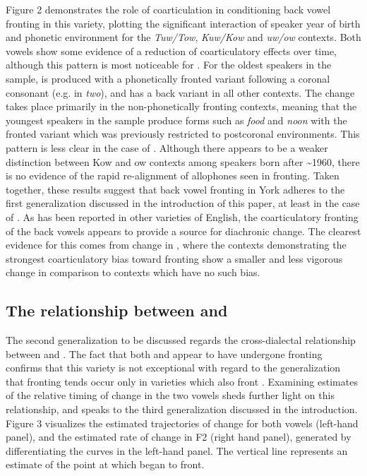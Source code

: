\documentclass[12pt]{article}
\begin{document}
Figure 2 demonstrates the role of coarticulation in conditioning back vowel fronting in this variety, plotting the significant interaction of speaker year of birth and phonetic environment for the \textit{Tuw/Tow}, \textit{Kuw/Kow} and \textit{uw/ow} contexts. Both vowels show some evidence of a reduction of coarticulatory effects over time, although this pattern is most noticeable for . For the oldest speakers in the sample,  is produced with a phonetically fronted variant following a coronal consonant (e.g. in \textit{two}), and has a back variant in all other contexts. The change takes place primarily in the non-phonetically fronting contexts, meaning that the youngest speakers in the sample produce forms such as \textit{food} and \textit{noon} with the fronted variant which was previously restricted to postcoronal environments. This pattern is less clear in the case of . Although there appears to be a weaker distinction between Kow and ow contexts among speakers born after \textasciitilde1960, there is no evidence of the rapid re-alignment of allophones seen in  fronting. Taken together, these results suggest that back vowel fronting in York adheres to the first generalization discussed in the introduction of this paper, at least in the case of . As has been reported in other varieties of English, the coarticulatory fronting of the back vowels appears to provide a source for diachronic change. The clearest evidence for this comes from change in , where the contexts demonstrating the strongest coarticulatory bias toward fronting show a smaller and less vigorous change in comparison to contexts which have no such bias. 

\subsection{The relationship between  and }
The second generalization to be discussed regards the cross-dialectal relationship between  and . The fact that both  and  appear to have undergone fronting confirms that this variety is not exceptional with regard to the generalization that  fronting tends occur only in varieties which also front . Examining estimates of the relative timing of change in the two vowels sheds further light on this relationship, and speaks to the third generalization discussed in the introduction. Figure 3 visualizes the estimated trajectories of change for both vowels (left-hand panel), and the estimated rate of change in F2 (right hand panel), generated by differentiating the curves in the left-hand panel. The vertical line represents an estimate of the point at which  began to front.
\end{document}
